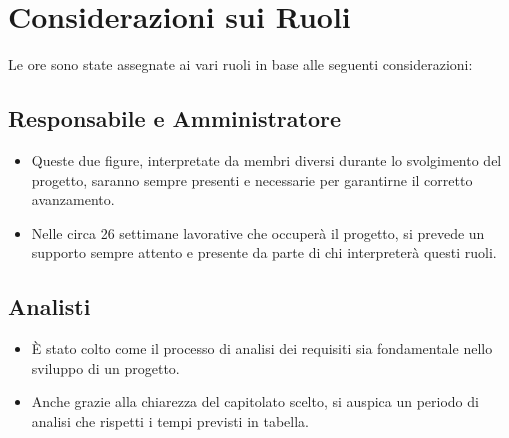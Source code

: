 \documentclass[11pt]{article}
\begin{document}
%    

\section{Considerazioni sui Ruoli}
Le ore sono state assegnate ai vari ruoli in base alle seguenti considerazioni:

\subsection{Responsabile e Amministratore}
    \begin{itemize}
        \item Queste due figure, interpretate da membri diversi durante lo svolgimento del progetto, saranno sempre presenti e necessarie per garantirne il corretto avanzamento. 
        \item Nelle circa 26 settimane lavorative che occuperà  il progetto, si prevede un supporto sempre attento e presente da parte di chi interpreterà questi ruoli.
    \end{itemize}
\subsection{Analisti}
    \begin{itemize}
        \item È stato colto come il processo di analisi dei requisiti sia fondamentale nello sviluppo di un progetto.
        \item Anche grazie alla chiarezza del capitolato scelto, si auspica un periodo di analisi che rispetti i tempi previsti in tabella.
    \end{itemize}
\end{document}
